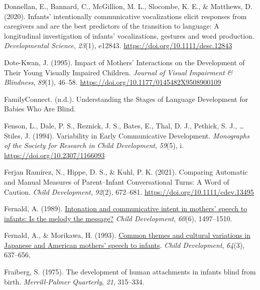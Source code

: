 \documentclass[
  man,floatsintext]{apa6}
\newlength{\cslhangindent}
\newlength{\cslentryspacingunit} %
\newenvironment{CSLReferences}[2] %
 {%
  \setlength{\parindent}{0pt}
  \ifodd #1
  \let\oldpar\par
  \def\par{\hangindent=\cslhangindent\oldpar}
  \fi
  \setlength{\parskip}{#2\cslentryspacingunit}
 }%
 {}
\begin{document}
\begin{CSLReferences}{1}{0}
\leavevmode{}%
Donnellan, E., Bannard, C., McGillion, M. L., Slocombe, K. E., \& Matthews, D. (2020). Infants' intentionally communicative vocalizations elicit responses from caregivers and are the best predictors of the transition to language: {A} longitudinal investigation of infants' vocalizations, gestures and word production. \emph{Developmental Science}, \emph{23}(1), e12843. \url{https://doi.org/10.1111/desc.12843}

\leavevmode{}%
Dote-Kwan, J. (1995). Impact of {Mothers}' {Interactions} on the {Development} of {Their Young Visually Impaired Children}. \emph{Journal of Visual Impairment \& Blindness}, \emph{89}(1), 46--58. \url{https://doi.org/10.1177/0145482X9508900109}

\leavevmode{}%
FamilyConnect. (n.d.). Understanding the {Stages} of {Language Development} for {Babies Who Are Blind}.

\leavevmode{}%
Fenson, L., Dale, P. S., Reznick, J. S., Bates, E., Thal, D. J., Pethick, S. J., \ldots{} Stiles, J. (1994). Variability in {Early Communicative Development}. \emph{Monographs of the Society for Research in Child Development}, \emph{59}(5), i. \url{https://doi.org/10.2307/1166093}

\leavevmode{}%
Ferjan Ramírez, N., Hippe, D. S., \& Kuhl, P. K. (2021). Comparing {Automatic} and {Manual Measures} of {Parent}--{Infant Conversational Turns}: {A Word} of {Caution}. \emph{Child Development}, \emph{92}(2), 672--681. \url{https://doi.org/10.1111/cdev.13495}

\leavevmode{}%
Fernald, A. (1989). \href{https://www.ncbi.nlm.nih.gov/pubmed/2612255}{Intonation and communicative intent in mothers' speech to infants: Is the melody the message?} \emph{Child Development}, \emph{60}(6), 1497--1510.

\leavevmode{}%
Fernald, A., \& Morikawa, H. (1993). \href{https://www.ncbi.nlm.nih.gov/pubmed/8339686}{Common themes and cultural variations in {Japanese} and {American} mothers' speech to infants}. \emph{Child Development}, \emph{64}(3), 637--656.

\leavevmode{}%
Fraiberg, S. (1975). The development of human attachments in infants blind from birth. \emph{Merrill-Palmer Quarterly}, \emph{21}, 315--334.


\end{CSLReferences}
\end{document}

